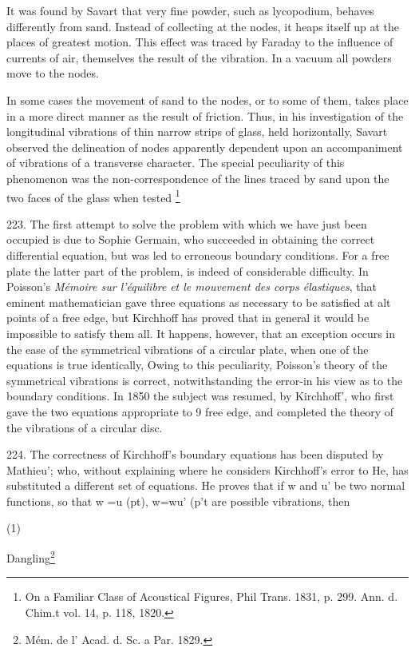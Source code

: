 It was found by Savart that very fine powder, such as lycopodium, behaves
differently from sand. Instead of collecting at
the nodes, it heaps itself up at the places of greatest motion.
This effect was traced by Faraday to the influence of currents of
air, themselves the result of the vibration. In a vacuum all
powders move to the nodes.

In some cases the movement of sand to the nodes, or to some
of them, takes place in a more direct manner as the result of
friction. Thus, in his investigation of the longitudinal vibrations
of thin narrow strips of glass, held horizontally, Savart observed
the delineation of nodes apparently dependent upon an accompaniment of
vibrations of a transverse character. The special
peculiarity of this phenomenon was the non-correspondence of the
lines traced by sand upon the two faces of the glass when tested
\footnote{On a Familiar Class of Acoustical Figures, Phil Trans. 1831, p. 299.
Ann. d. Chim.t vol. 14, p. 118, 1820.}


223. The first attempt to solve the problem with which we have just been
occupied is due to Sophie Germain, who succeeded in obtaining the
correct differential equation, but was led to erroneous boundary
conditions. For a free plate the latter part of the problem, is indeed
of considerable difficulty. In Poisson's \emph{Mémoire sur l'équilibre}
\emph{et le mouvement des corps élastiques}, that eminent mathematician
gave three equations as necessary to be satisfied at alt points of a
free edge, but Kirchhoff has proved that in general it would be
impossible to satisfy them all. It happens, however, that an exception
occurs in the ease of the symmetrical vibrations of a circular plate,
when one of the equations is true identically, Owing to this
peculiarity, Poisson's theory of the symmetrical vibrations is correct,
notwithstanding the error-in his view as to the boundary conditions.
In 1850 the subject was resumed, by Kirchhoff', who first gave the two
equations appropriate to 9 free edge, and completed the theory of the
vibrations of a circular disc.

224. The correctness of Kirchhoff's boundary equations has been disputed
by Mathieu'; who, without explaining where he considers Kirchhoff's
error to He, has substituted a different set of equations. He proves
that if w and u' be two normal functions, so that w =u (pt), w=wu' (p't
are possible vibrations, then

(1)

Dangling\footnote{ Mém. de l' Acad. d. Sc. a Par. 1829.}

